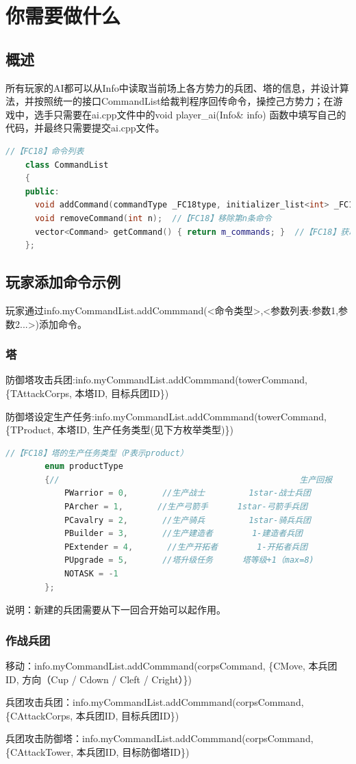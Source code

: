 \documentclass[a4paper,4pt]{article}
\begin{document}
\section{你需要做什么}
\subsection{概述}
所有玩家的AI都可以从Info中读取当前场上各方势力的兵团、塔的信息，并设计算法，并按照统一的接口CommandList给裁判程序回传命令，操控己方势力；在游戏中，选手只需要在ai.cpp文件中的void player\_ai(Info\& info) {  }函数中填写自己的代码，并最终只需要提交ai.cpp文件。
\begin{lstlisting}[language={C++},title={添加命令有关代码}]  %插入代码块
    //【FC18】命令列表
    class CommandList
    {
    public:
      void addCommand(commandType _FC18type, initializer_list<int> _FC18parameters);
      void removeCommand(int n);  //【FC18】移除第n条命令
      vector<Command> getCommand() { return m_commands; }  //【FC18】获取所有命令
    };
\end{lstlisting}

\subsection{玩家添加命令示例}
玩家通过info.myCommandList.addCommmand(<命令类型>,<参数列表:参数1,参数2...>)添加命令。
\subsubsection{塔}
防御塔攻击兵团:info.myCommandList.addCommmand(towerCommand, \{TAttackCorps, 本塔ID, 目标兵团ID\})\par
防御塔设定生产任务:info.myCommandList.addCommmand(towerCommand, \{TProduct, 本塔ID, 生产任务类型(见下方枚举类型)\})\par
\begin{lstlisting}[language={C++},title={生产任务类型}]  %插入代码块
		//【FC18】塔的生产任务类型（P表示product）
		enum productType
		{//                                                 生产回报
			PWarrior = 0,       //生产战士         1star-战士兵团
			PArcher = 1,       //生产弓箭手      1star-弓箭手兵团
			PCavalry = 2,       //生产骑兵         1star-骑兵兵团
			PBuilder = 3,       //生产建造者        1-建造者兵团
			PExtender = 4,       //生产开拓者        1-开拓者兵团
			PUpgrade = 5,       //塔升级任务      塔等级+1（max=8)
			NOTASK = -1
		};
\end{lstlisting}
说明：新建的兵团需要从下一回合开始可以起作用。
\subsubsection{作战兵团}
移动：info.myCommandList.addCommmand(corpsCommand, \{CMove, 本兵团ID, 方向（Cup / Cdown / Cleft / Cright）\})\par
兵团攻击兵团：info.myCommandList.addCommmand(corpsCommand, \{CAttackCorps, 本兵团ID, 目标兵团ID\})\par
兵团攻击防御塔：info.myCommandList.addCommmand(corpsCommand, \{CAttackTower, 本兵团ID, 目标防御塔ID\})\par
\end{document}
